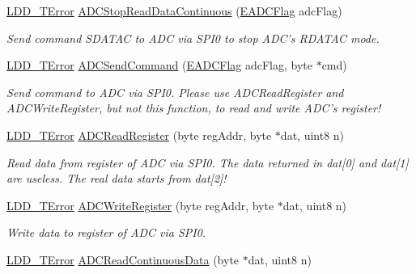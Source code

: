 \begin{DoxyCompactItemize}
\hyperlink{group___p_e___types__module_ga24c2b045fd04e79e85f261ce4df35588}{L\-D\-D\-\_\-\-T\-Error} \hyperlink{group___a_d_c__module_ga9cdb5ac2b155fab1a7510f980ea450ce}{A\-D\-C\-Stop\-Read\-Data\-Continuous} (\hyperlink{group___enum_grp_ga7a77f876c6fae36cb97dfc3ba1e07665}{E\-A\-D\-C\-Flag} adc\-Flag)
\begin{DoxyCompactList}\small\item\em Send command S\-D\-A\-T\-A\-C to A\-D\-C via S\-P\-I0 to stop A\-D\-C's R\-D\-A\-T\-A\-C mode. \end{DoxyCompactList}\item 
\hyperlink{group___p_e___types__module_ga24c2b045fd04e79e85f261ce4df35588}{L\-D\-D\-\_\-\-T\-Error} \hyperlink{group___a_d_c__module_ga0c4f12b67a2d24c0a3f37b6f4d8a4df2}{A\-D\-C\-Send\-Command} (\hyperlink{group___enum_grp_ga7a77f876c6fae36cb97dfc3ba1e07665}{E\-A\-D\-C\-Flag} adc\-Flag, byte $\ast$cmd)
\begin{DoxyCompactList}\small\item\em Send command to A\-D\-C via S\-P\-I0. Please use A\-D\-C\-Read\-Register and A\-D\-C\-Write\-Register, but not this function, to read and write A\-D\-C's register! \end{DoxyCompactList}\item 
\hyperlink{group___p_e___types__module_ga24c2b045fd04e79e85f261ce4df35588}{L\-D\-D\-\_\-\-T\-Error} \hyperlink{group___a_d_c__module_ga5a9a35fa254e8230cbc9be8858660f22}{A\-D\-C\-Read\-Register} (byte reg\-Addr, byte $\ast$dat, uint8 n)
\begin{DoxyCompactList}\small\item\em Read data from register of A\-D\-C via S\-P\-I0. The data returned in dat\mbox{[}0\mbox{]} and dat\mbox{[}1\mbox{]} are useless. The real data starts from dat\mbox{[}2\mbox{]}! \end{DoxyCompactList}\item 
\hyperlink{group___p_e___types__module_ga24c2b045fd04e79e85f261ce4df35588}{L\-D\-D\-\_\-\-T\-Error} \hyperlink{group___a_d_c__module_ga607e77df260f2c971d948c580a933280}{A\-D\-C\-Write\-Register} (byte reg\-Addr, byte $\ast$dat, uint8 n)
\begin{DoxyCompactList}\small\item\em Write data to register of A\-D\-C via S\-P\-I0. \end{DoxyCompactList}\item 
\hyperlink{group___p_e___types__module_ga24c2b045fd04e79e85f261ce4df35588}{L\-D\-D\-\_\-\-T\-Error} \hyperlink{group___a_d_c__module_ga8e75384212a08e64cdddf9fec4104248}{A\-D\-C\-Read\-Continuous\-Data} (byte $\ast$dat, uint8 n)

\end{DoxyCompactItemize}
